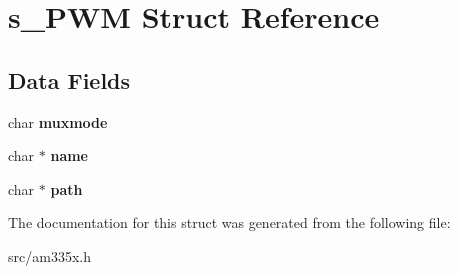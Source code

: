 \hypertarget{structs___p_w_m}{\section{s\-\_\-\-P\-W\-M Struct Reference}
\label{structs___p_w_m}
}
\subsection*{Data Fields}
\begin{DoxyCompactItemize}
\item 
\hypertarget{structs___p_w_m_a29c76b00b745b2dd207ac576dcb658c3}{char {\bfseries muxmode}}\label{structs___p_w_m_a29c76b00b745b2dd207ac576dcb658c3}

\item 
\hypertarget{structs___p_w_m_a5ac083a645d964373f022d03df4849c8}{char $\ast$ {\bfseries name}}\label{structs___p_w_m_a5ac083a645d964373f022d03df4849c8}

\item 
\hypertarget{structs___p_w_m_a44196e6a5696d10442c29e639437196e}{char $\ast$ {\bfseries path}}\label{structs___p_w_m_a44196e6a5696d10442c29e639437196e}

\end{DoxyCompactItemize}


The documentation for this struct was generated from the following file\-:\begin{DoxyCompactItemize}
\item 
src/am335x.\-h\end{DoxyCompactItemize}
